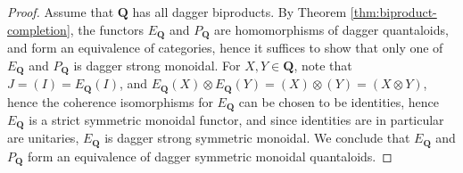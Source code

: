 \documentclass[12pt]{tac}
\theoremstyle{definition}
\theoremstyle{remark}
\newcommand{\<}{\langle}
\renewcommand{\>}{\rangle}
\renewcommand{\:}{\colon}
\begin{document}
\begin{proof}
Assume that $\mathbf Q$ has all dagger biproducts. 
By Theorem \ref{thm:biproduct-completion}, the functors $E_\mathbf Q$ and $P_\mathbf Q$ are homomorphisms of dagger quantaloids, and form an equivalence of categories, hence it suffices to show that only one of $E_\mathbf Q$ and $P_\mathbf Q$ is dagger strong monoidal. For $X,Y\in\mathbf Q$, note that $J=(I)=E_\mathbf Q(I)$, and $E_\mathbf Q(X)\otimes E_{\mathbf Q}(Y)=(X)\otimes (Y)=(X\otimes Y)$, hence the coherence isomorphisms for $E_\mathbf Q$ can be chosen to be identities, hence $E_\mathbf Q$ is a strict symmetric monoidal functor, and since identities are in particular are unitaries, $E_\mathbf Q$ is dagger strong symmetric monoidal. We conclude that $E_\mathbf Q$ and $P_\mathbf Q$ form an equivalence of dagger symmetric monoidal quantaloids. 
\end{proof}
\end{document}
